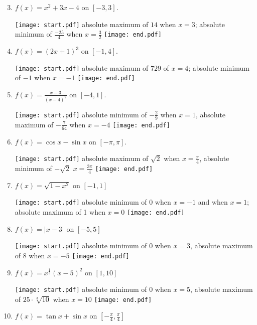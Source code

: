 \documentclass[12pt]{article}
\begin{document}

\begin{enumerate}
\setcounter{enumi}{2}

\item $f(x) = x^2+3x-4$ on $[-3,3]$. 

\texttt{[image: start.pdf]}
{{absolute maximum of $14$ when $x=3$; absolute minimum of $\frac{-25}{4}$ when $x=\frac{3}{2}$}}
\texttt{[image: end.pdf]}


\item $f(x) =(2x+1)^3$ on $[-1,4]$. 

\texttt{[image: start.pdf]}
{{absolute maximum of $729$ of $x=4$; absolute minimum of $-1$ when $x=-1$}}
\texttt{[image: end.pdf]}


\item $f(x) = \frac{x-3}{(x-4)^2}$ on $[-4,1]$. 

\texttt{[image: start.pdf]}
{{absolute minimum of $-\frac{2}{9}$ when $x=1$, absolute maximum of $-\frac{7}{64}$ when $x=-4$}}
\texttt{[image: end.pdf]}


\item $f(x) = \cos{x}-\sin{x}$ on $[-\pi,\pi]$. 

\texttt{[image: start.pdf]}
{{absolute maximum of $\sqrt{2}$ when $x=\frac{\pi}{4}$, absolute minimum of $-\sqrt{2}$ $x=\frac{3\pi}{4}$}}
\texttt{[image: end.pdf]}


\item $f(x) = \sqrt{1-x^2}$ on $[-1,1]$ 

\texttt{[image: start.pdf]}
{{absolute minimum of 0 when $x=-1$ and when $x=1$; absolute maximum of 1 when $x=0$}}
\texttt{[image: end.pdf]}


\item $f(x) = |x-3|$ on $[-5,5]$ 

\texttt{[image: start.pdf]}
{{absolute minimum of 0 when $x=3$, absolute maximum of 8 when $x=-5$}}
\texttt{[image: end.pdf]}


\item $f(x) = x^{\frac{1}{3}}(x-5)^2$ on $[1,10]$ 

\texttt{[image: start.pdf]}
{{absolute minimum of 0 when $x=5$, absolute maximum of $25 \cdot \sqrt[3]{10}$ when $x=10$}}
\texttt{[image: end.pdf]}


\item $f(x) = \tan{x}+\sin{x}$ on $\left[-\frac{\pi}{4}, \frac{\pi}{4}\right]$ 


\end{enumerate}
\end{document}
